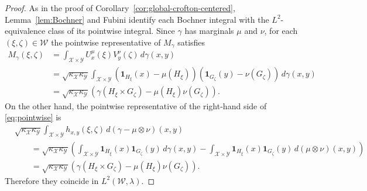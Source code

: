 \documentclass[10pt,a4paper]{amsart}
\newcommand{\one}{\mathbf{1}}
\begin{document}
\begin{proof}
    As in the proof of Corollary~\ref{cor:global-crofton-centered},
Lemma~\ref{lem:Bochner} and Fubini identify each Bochner integral with
the $L^2$-equivalence class of its pointwise integral. Since $\gamma$ has
marginals $\mu$ and $\nu$, for each $(\xi,\zeta)\in\mathcal W$ the
pointwise representative of $M_\gamma$ satisfies
\begin{align*}
M_\gamma(\xi,\zeta)
&=
\int_{\mathcal X\times\mathcal Y}
U_x^\mu(\xi)V_y^\nu(\zeta)\,d\gamma(x,y)\\
&=
\sqrt{\kappa_\mathcal X\kappa_\mathcal Y}
\int_{\mathcal X\times\mathcal Y}
\left(\one_{H_\xi}(x)-\mu(H_\xi)\right)
\left(\one_{G_\zeta}(y)-\nu(G_\zeta)\right)
\,d\gamma(x,y)\\
&=
\sqrt{\kappa_\mathcal X\kappa_\mathcal Y}
\left(
\gamma(H_\xi\times G_\zeta)
-\mu(H_\xi)\nu(G_\zeta)
\right).
\end{align*}
On the other hand, the pointwise representative of the right-hand side of
\eqref{eq:pointwise} is
\begin{align*}
&\sqrt{\kappa_\mathcal X\kappa_\mathcal Y}
\int_{\mathcal X\times\mathcal Y}
h_{x,y}(\xi,\zeta)\,d(\gamma-\mu\otimes\nu)(x,y)\\
&\qquad=
\sqrt{\kappa_\mathcal X\kappa_\mathcal Y}
\left(
\int_{\mathcal X\times\mathcal Y}
\one_{H_\xi}(x)\one_{G_\zeta}(y)\,d\gamma(x,y)
-
\int_{\mathcal X\times\mathcal Y}
\one_{H_\xi}(x)\one_{G_\zeta}(y)\,d(\mu\otimes\nu)(x,y)
\right)\\
&\qquad=
\sqrt{\kappa_\mathcal X\kappa_\mathcal Y}
\left(
\gamma(H_\xi\times G_\zeta)
-\mu(H_\xi)\nu(G_\zeta)
\right).
\end{align*}
Therefore they coincide in $L^2(\mathcal W,\lambda)$.
\end{proof}
\end{document}
